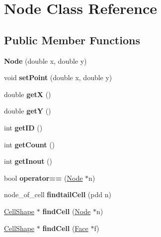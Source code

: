 \hypertarget{class_node}{}\section{Node Class Reference}
\label{class_node}
\subsection*{Public Member Functions}
\begin{DoxyCompactItemize}
\item 
\mbox{\label{class_node_ab488e53f2acfc84ef0cacc1951f92c3d}} 
{\bfseries Node} (double x, double y)
\item 
\mbox{\label{class_node_aacf44ae848148ecec055b472ca54d3f0}} 
void {\bfseries set\+Point} (double x, double y)
\item 
\mbox{\label{class_node_a8d8ccf6a6da7717ea6aa67e52c7c9017}} 
double {\bfseries getX} ()
\item 
\mbox{\label{class_node_a8877121bf44537ccbe2f3c441fa3b664}} 
double {\bfseries getY} ()
\item 
\mbox{\label{class_node_a8dd9a1d6ac9638fd1168283ad47e5127}} 
int {\bfseries get\+ID} ()
\item 
\mbox{\label{class_node_a7fa9c0a066de25a23670691f6ca99116}} 
int {\bfseries get\+Count} ()
\item 
\mbox{\label{class_node_af78d508e40cfc793b93d92c1d2e1f45a}} 
int {\bfseries get\+Inout} ()
\item 
\mbox{\label{class_node_ab6bc96b2f8985486d8e19c1aad40a68a}} 
bool {\bfseries operator==} (\mbox{\hyperlink{class_node}{Node}} $\ast$n)
\item 
\mbox{\label{class_node_a0594575d592b6d144ae27cdab9393237}} 
node\+\_\+of\+\_\+cell {\bfseries findtail\+Cell} (pdd n)
\item 
\mbox{\label{class_node_a07a7b923553dd5d7067fe43b8638f1aa}} 
\mbox{\hyperlink{class_cell_shape}{Cell\+Shape}} $\ast$ {\bfseries find\+Cell} (\mbox{\hyperlink{class_node}{Node}} $\ast$n)
\item 
\mbox{\label{class_node_a0d0966d6ee3069fac36364c385cf13a0}} 
\mbox{\hyperlink{class_cell_shape}{Cell\+Shape}} $\ast$ {\bfseries find\+Cell} (\mbox{\hyperlink{class_face}{Face}} $\ast$f)
\end{DoxyCompactItemize}
